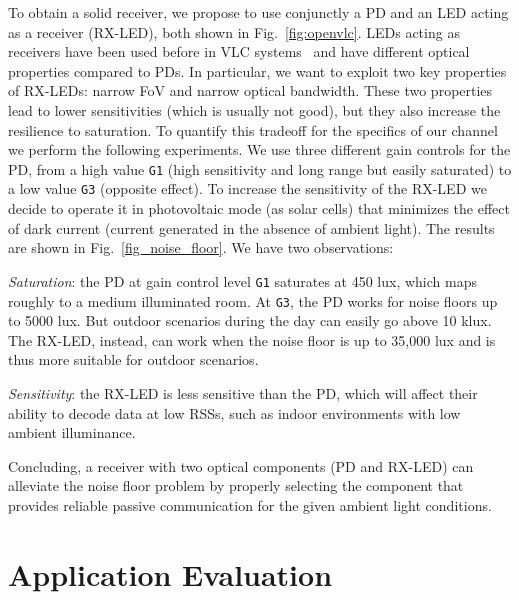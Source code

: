 \documentclass[10pt]{sig-alternate-05-2015}
\begin{document}
{To obtain a solid receiver, we propose to use conjunctly a PD and an LED acting as a receiver (RX-LED), both shown in Fig.~\ref{fig:openvlc}. LEDs acting as receivers have been used before in VLC systems~\cite{Dietz,giustiniano_wd,Schmid2013,Wang2015HotWireless} and have different optical properties compared to PDs. In particular, we want to exploit two key properties of RX-LEDs: narrow FoV and narrow optical bandwidth. These two properties lead to lower sensitivities (which is usually not good), but they also increase the resilience to saturation. To quantify this tradeoff for the specifics of our channel we perform the following experiments. We use three different gain controls for the PD, from a high value {\tt G1} (high sensitivity and long range but easily saturated) to a low value {\tt G3} (opposite effect). To increase the sensitivity of the RX-LED we decide to operate it in photovoltaic mode (as solar cells) that minimizes the effect of dark current (current generated in the absence of ambient light). The results are shown in Fig.~\ref{fig_noise_floor}. We have two observations:

\textit{Saturation}: the PD at gain control level {\tt G1} saturates at 450 lux, which maps roughly to a medium illuminated room. At {\tt G3}, the PD works for noise floors up to 5000 lux. But outdoor scenarios during the day can easily go above 10 klux. The RX-LED, instead, can work when the noise floor is up to 35,000 lux and is thus more suitable for outdoor scenarios.

\textit{Sensitivity}: the RX-LED is less sensitive than the PD, which will affect their ability to decode data at low RSSs, such as indoor environments with low ambient illuminance. 

Concluding, a receiver with two optical components (PD and RX-LED) can alleviate the noise floor problem by properly selecting the component that provides reliable passive communication for the given ambient light conditions. 


\section{Application Evaluation} \label{sec_app}

}
\end{document}

